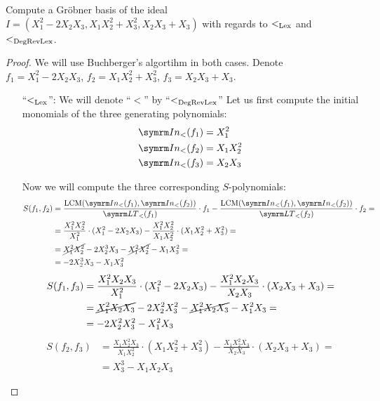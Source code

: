\begin{problem}
Compute a Gröbner basis of the ideal \(I = (X_1^2 - 2 X_2 X_3, X_1 X_2^2 + X_3^2, X_2 X_3 + X_3)\) with regards to \(<_\mathrm{Lex}\) and \(<_\mathrm{DegRevLex}\).
\end{problem}
\begin{proof}
We will use Buchberger's algortihm in both cases. Denote \(f_1 = X_1^2 - 2 X_2 X_3\), \(f_2 = X_1 X_2^2 + X_3^2\), \(f_3 = X_2 X_3 + X_3\).

\begin{itemize}
    \item[``\(<_\mathrm{Lex}\)'':] We will denote ``\(<\)'' by ``\(<_\mathrm{DegRevLex}\)'' Let us first compute the initial monomials of the three generating polynomials:
    \begin{align*}
        \In (f_1) &= X_1^2 \\
        \In (f_2) &= X_1 X_2^2 \\
        \In (f_3) &= X_2 X_3
    \end{align*}
    
    Now we will compute the three corresponding \(S\)-polynomials:
    \begin{align*}
        S(f_1, f_2) &= \frac{\LCM(\In(f_1), \In(f_2))}{\LT(f_1)} \cdot f_1 - \frac{\LCM(\In(f_1), \In(f_2))}{\LT(f_2)} \cdot f_2 = \\
        &= \frac{X_1^2 X_2^2}{X_1^2} \cdot (X_1^2 - 2 X_2 X_3) - \frac{X_1^2 X_2^2}{X_1 X_2^2} \cdot (X_1 X_2^2 + X_3^2) = \\
        &= \cancel{X_1^2 X_2^2} - 2 X_2^3 X_3 - \cancel{X_1^2 X_2^2} - X_1 X_3^2 = \\
        &= - 2 X_2^3 X_3 - X_1 X_3^2
    \end{align*}
    \begin{align*}
        S(f_1, f_3) &= \frac{X_1^2 X_2 X_3}{X_1^2} \cdot (X_1^2 - 2 X_2 X_3) - \frac{X_1^2 X_2 X_3}{X_2 X_3} \cdot (X_2 X_3 + X_3) = \\
        &= \cancel{X_1^2 X_2 X_3} - 2 X_2^2 X_3^2 - \cancel{X_1^2 X_2 X_3} - X_1^2 X_3 = \\
        &= -2 X_2^2 X_3^2 - X_1^2 X_3
    \end{align*}
    \begin{align*}
        S(f_2, f_3) &= \frac{X_1 X_2^2 X_3}{X_1 X_2^2} \cdot (X_1 X_2^2 + X_3^2) - \frac{X_1 X_2^2 X_3}{X_2 X_3} \cdot (X_2 X_3 + X_3) = \\
        &= X_3^3 - X_1 X_2 X_3
    \end{align*}
    

\end{itemize}
\end{proof}
